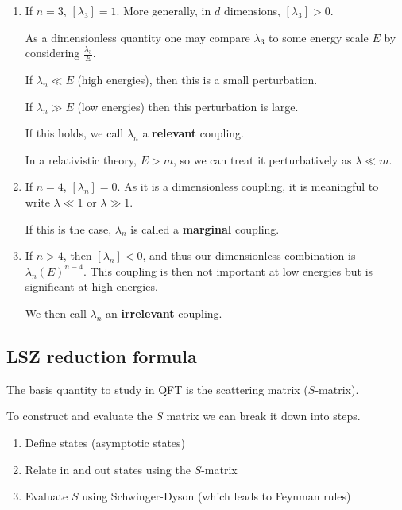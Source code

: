\begin{enumerate}[label=\arabic*)]
    \item If $n = 3$, $\left[ \lambda_3 \right] = 1$. More generally, in $d$ dimensions, $\left[ \lambda_3 \right] > 0$.

        As a dimensionless quantity one may compare $\lambda_3$ to some energy scale $E$ by considering $\frac{\lambda_3}{E}$.

        If $\lambda_n \ll E$ (high energies), then this is a small perturbation.

        If $\lambda_n \gg E$ (low energies) then this perturbation is large.

        If this holds, we call $\lambda_n$ a \textbf{relevant} coupling.

        In a relativistic theory, $E > m$, so we can treat it perturbatively as $\lambda \ll m$.

    \item If $n = 4$, $\left[ \lambda_n \right] = 0$. As it is a dimensionless coupling, it is meaningful to write $\lambda \ll 1$ or $\lambda \gg 1$.

        If this is the case, $\lambda_n$ is called a \textbf{marginal} coupling.

    \item If $n > 4$, then $\left[ \lambda_n \right] < 0$, and thus our dimensionless combination is $\lambda_n \left( E \right)^{n-4}$. This coupling is then not important at low energies but is significant at high energies.

        We then call $\lambda_n$ an \textbf{irrelevant} coupling.
\end{enumerate}

\subsection{LSZ reduction formula}

The basis quantity to study in QFT is the scattering matrix ($S$-matrix).


To construct and evaluate the $S$ matrix we can break it down into steps.
\begin{enumerate}[label=\arabic*)]
    \item Define states (asymptotic states)
    \item Relate in and out states using the $S$-matrix
    \item Evaluate $S$ using Schwinger-Dyson (which leads to Feynman rules)
\end{enumerate}


